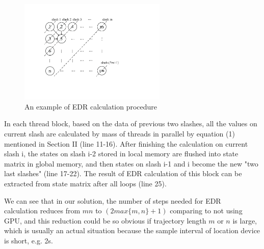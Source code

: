 \documentclass[conference]{IEEEtran}
\begin{document}
\begin{figure}[!t]\centering
	\includegraphics[width=7cm]{pdf/DPstate.pdf}
	\caption{An example of EDR calculation procedure\label{fig:DPstate}}
\end{figure}


In each thread block, based on the data of previous two slashes, all the values on current slash are calculated by mass of threads in parallel by equation (1) mentioned in Section II (line 11-16). After finishing the calculation on current slash i, the states on slash i-2 stored in local memory are flushed into state matrix in global memory, and then states on slash i-1 and i become the new "two last slashes" (line 17-22). The result of EDR calculation of this block can be extracted from state matrix after all loops (line 25). 

We can see that in our solution, the number of steps needed for EDR　calculation reduces from $mn$ to $(2max\{m,n\}+1)$ comparing to not using GPU, and this reduction could be so obvious if trajectory length $m$ or $n$ is large, which is usually an actual situation because the sample interval of location device is short, e.g. 2s.

\end{document}
